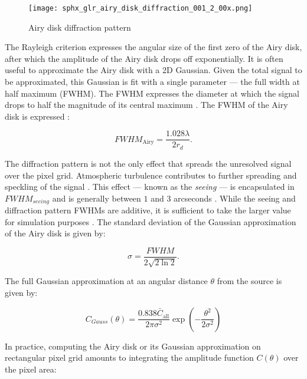 \begin{figure}[ht]
  \centering
  \texttt{[image: sphx\_glr\_airy\_disk\_diffraction\_001\_2\_00x.png]}
  \caption{Airy disk diffraction pattern}
  \label{fig:airy_disk_magnitude}
\end{figure}

The Rayleigh criterion expresses the angular size of the first zero of the Airy disk, after which the amplitude of the Airy disk drops off exponentially. It is often useful to approximate the Airy disk with a 2D Gaussian. Given the total signal to be approximated, this Gaussian is fit with a single parameter --- the full width at half maximum (FWHM). The FWHM expresses the diameter at which the signal drops to half the magnitude of its central maximum \cite{frueh2019notes}. The FWHM of the Airy disk is expressed \cite{frueh2019notes}:

\begin{equation} \label{eq:fwhm_airy}
  FWHM_\mathrm{Airy} = \frac{1.028 \lambda}{2 r_d}.
\end{equation}

The diffraction pattern is not the only effect that spreads the unresolved signal over the pixel grid. Atmospheric turbulence contributes to further spreading and speckling of the signal \cite{frueh2019notes}. This effect --- known as the \textit{seeing} --- is encapsulated in $FWHM_{seeing}$ and is generally between $1$ and $3$ arcseconds \cite{frueh2019notes}. While the seeing and diffraction pattern FWHMs are additive, it is sufficient to take the larger value for simulation purposes \cite{frueh2019notes}. The standard deviation of the Gaussian approximation of the Airy disk is given by:

\begin{equation} \label{eq:airy_variance}
  \sigma = \frac{FWHM}{2 \sqrt{2 \ln{2}}}.
\end{equation}

The full Gaussian approximation at an angular distance $\theta$ from the source is given by:

\begin{equation} \label{eq:airy_gaussian}
  C_{Gauss}(\theta) = \frac{0.838 \bar{C}_\mathrm{all}}{2 \pi \sigma^2} \exp\left( - \frac{\theta^2}{2 \sigma^2} \right)
\end{equation}

In practice, computing the Airy disk or its Gaussian approximation on rectangular pixel grid amounts to integrating the amplitude function $C(\theta)$ over the pixel area:

